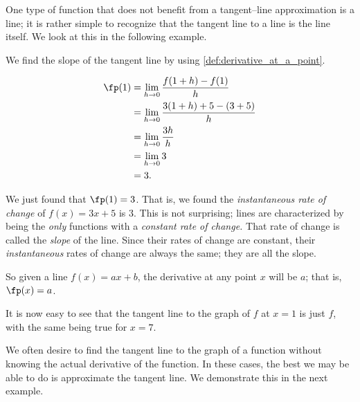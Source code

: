 One type of function that does not benefit from a tangent--line approximation is a line; it is rather simple to recognize that the tangent line to a line is the line itself. We look at this in the following example.

{We find the slope of the tangent line by using \autoref{def:derivative_at_a_point}.

	\begin{align*}
	\fp(1) &=	\lim_{h\to 0}\frac{f(1+h)-f(1)}{h} \\
					&=	\lim_{h\to 0} \frac{3(1+h)+5 - (3+5)}{h}\\
					&=	\lim_{h\to 0} \frac{3h}{h}\\
					&=	\lim_{h\to 0} 3\\
					&= 3.
	\end{align*}
	
We just found that $\fp(1) = 3$. That is, we found the \textit{instantaneous rate of change} of $f(x) = 3x+5$ is $3$. This is not surprising; lines are characterized by being the \textit{only} functions with a \textit{constant rate of change.} That rate of change is called the \textit{slope} of the line. Since their rates of change are constant, their \textit{instantaneous} rates of  change are always the same; they are all the slope.

So given a line $f(x) = ax+b$, the derivative at any point $x$ will be $a$; that is, $\fp(x) = a$. 

It is now easy to see that the tangent line to the graph of $f$ at $x=1$ is just $f$, with the same being true for $x=7$.}

We often desire to find the tangent line to the graph of a function without knowing the actual derivative of the function. In these cases, the best we may be able to do is approximate the tangent line. We demonstrate this in the next example.

